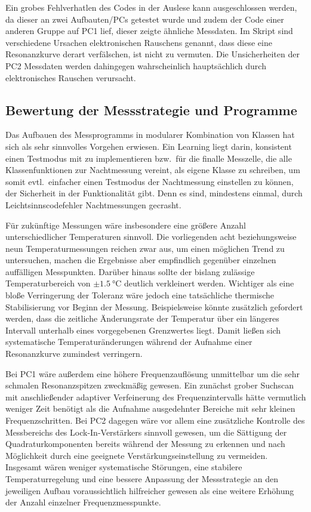 \documentclass[11pt,a4paper]{article}
\begin{document}
Ein grobes Fehlverhatlen des Codes in der Auslese kann ausgeschlossen werden, da dieser an zwei Aufbauten/PCs getestet wurde und zudem der Code einer anderen Gruppe auf PC1 lief, dieser zeigte ähnliche Messdaten.
Im Skript sind verschiedene Ursachen elektronischen Rauschens genannt, dass diese eine Resonanzkurve derart verfälschen, ist nicht zu vermuten. Die Unsicherheiten der PC2 Messdaten werden dahingegen wahrscheinlich hauptsächlich durch elektronisches Rauschen verursacht.

\subsection{Bewertung der Messstrategie und Programme}
Das Aufbauen des Messprogramms in modularer Kombination von Klassen hat sich als sehr sinnvolles Vorgehen erwiesen. Ein Learning liegt darin, konsistent einen Testmodus mit zu implementieren bzw.\ für die finalle Messzelle, die alle Klassenfunktionen zur Nachtmessung vereint, als eigene Klasse zu schreiben, um somit evtl.\ einfacher einen Testmodus der Nachtmessung einstellen zu können, der Sicherheit in der Funktionalität gibt. Denn es sind, mindestens einmal, durch Leichtsinnscodefehler Nachtmessungen gecrasht.

Für zukünftige Messungen wäre insbesondere eine größere Anzahl unterschiedlicher Temperaturen sinnvoll. Die vorliegenden acht beziehungsweise neun Temperaturmessungen reichen zwar aus, um einen möglichen Trend zu untersuchen, machen die Ergebnisse aber empfindlich gegenüber einzelnen auffälligen Messpunkten. Darüber hinaus sollte der bislang zulässige Temperaturbereich von $\pm\qty{1.5}{\degreeCelsius}$ deutlich verkleinert werden. Wichtiger als eine bloße Verringerung der Toleranz wäre jedoch eine tatsächliche thermische Stabilisierung vor Beginn der Messung. Beispielsweise könnte zusätzlich gefordert werden, dass die zeitliche Änderungsrate der Temperatur über ein längeres Intervall unterhalb eines vorgegebenen Grenzwertes liegt. Damit ließen sich systematische Temperaturänderungen während der Aufnahme einer Resonanzkurve zumindest verringern.

Bei PC1 wäre außerdem eine höhere Frequenzauflösung unmittelbar um die sehr schmalen Resonanzspitzen zweckmäßig gewesen. Ein zunächst grober Suchscan mit anschließender adaptiver Verfeinerung des Frequenzintervalls hätte vermutlich weniger Zeit benötigt als die Aufnahme ausgedehnter Bereiche mit sehr kleinen Frequenzschritten. Bei PC2 dagegen wäre vor allem eine zusätzliche Kontrolle des Messbereichs des Lock-In-Verstärkers sinnvoll gewesen, um die Sättigung der Quadraturkomponenten bereits während der Messung zu erkennen und nach Möglichkeit durch eine geeignete Verstärkungseinstellung zu vermeiden. Insgesamt wären weniger systematische Störungen, eine stabilere Temperaturregelung und eine bessere Anpassung der Messstrategie an den jeweiligen Aufbau voraussichtlich hilfreicher gewesen als eine weitere Erhöhung der Anzahl einzelner Frequenzmesspunkte.
\end{document}
